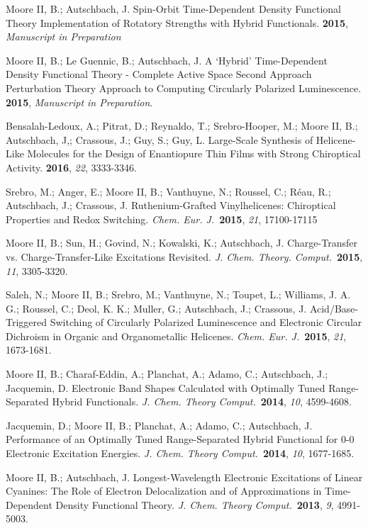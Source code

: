 \documentclass[12pt,letterpaper,oneside]{article}
\begin{document}
\begin{etaremune}
	\item Moore II, B.; Autschbach, J. Spin-Orbit Time-Dependent Density Functional Theory Implementation of Rotatory Strengths with Hybrid Functionals. \textbf{2015}, \textit{Manuscript in Preparation}\ 
	\item Moore II, B.; Le Guennic, B.; Autschbach, J. A `Hybrid' Time-Dependent Density Functional Theory - Complete Active Space Second Approach Perturbation Theory Approach to Computing Circularly Polarized Luminescence. \textbf{2015}, \textit{Manuscript in Preparation}.
	\item Bensalah-Ledoux, A.; Pitrat, D.; Reynaldo, T.; Srebro-Hooper, M.; Moore II, B.; Autschbach, J,; Crassous, J.; Guy, S.; Guy, L. Large-Scale Synthesis of Helicene-Like Molecules for the Design of Enantiopure Thin Films with Strong Chiroptical Activity. \textbf{2016}, \textit{22}, 3333-3346.
	\item Srebro, M.; Anger, E.; Moore II, B.; Vanthuyne, N.; Roussel, C.; R\'eau, R.; Autschbach, J.; Crassous, J. Ruthenium-Grafted Vinylhelicenes: Chiroptical Properties and Redox Switching. \textit{Chem. Eur. J.}\ \textbf{2015}, \textit{21}, 17100-17115
	\item Moore II, B.; Sun, H.; Govind, N.; Kowalski, K.; Autschbach, J. Charge-Transfer vs. Charge-Transfer-Like Excitations Revisited. \textit{J. Chem. Theory. Comput.}\ \textbf{2015}, \textit{11}, 3305-3320.
	\item Saleh, N.; Moore II, B.; Srebro, M.; Vanthuyne, N.; Toupet, L.; Williams, J. A. G.; Roussel, C.; Deol, K. K.; Muller, G.; Autschbach, J.; Crassous, J. Acid/Base-Triggered Switching of Circularly Polarized Luminescence and Electronic Circular Dichroism in Organic and Organometallic Helicenes. \textit{Chem. Eur. J.}\ \textbf{2015}, \textit{21}, 1673-1681.
	\item Moore II, B.; Charaf-Eddin, A.; Planchat, A.; Adamo, C.; Autschbach, J.; Jacquemin, D. Electronic Band Shapes Calculated with Optimally Tuned Range-Separated Hybrid Functionals. \textit{J. Chem. Theory Comput.}\ \textbf{2014}, \textit{10}, 4599-4608.
	\item Jacquemin, D.; Moore II, B.; Planchat, A.; Adamo, C.; Autschbach, J. Performance of an Optimally Tuned Range-Separated Hybrid Functional for 0-0 Electronic Excitation Energies. \textit{J. Chem. Theory Comput.}\ \textbf{2014}, \textit{10}, 1677-1685.
	\item Moore II, B.; Autschbach, J. Longest-Wavelength Electronic Excitations of Linear Cyanines: The Role of Electron Delocalization and of Approximations in Time-Dependent Density Functional Theory. \textit{J. Chem. Theory Comput.}\ \textbf{2013}, \textit{9}, 4991-5003.

\end{etaremune}
\end{document}
